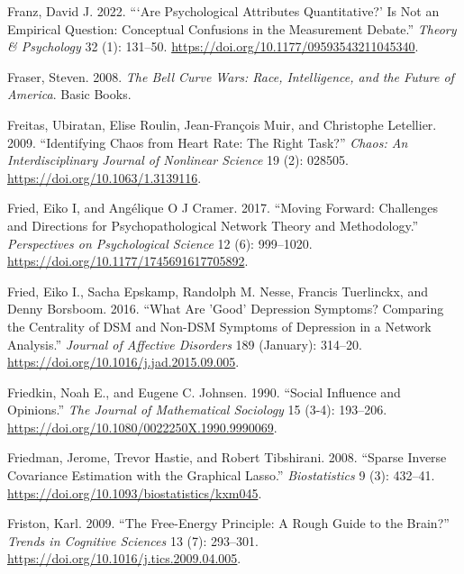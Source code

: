 \documentclass[
  a4paper,
  DIV=11,
  numbers=noendperiod,
  oneside]{scrreprt}
\newlength{\cslhangindent}
\newlength{\cslentryspacingunit} %
\newenvironment{CSLReferences}[2] %
 {%
  \setlength{\parindent}{0pt}
  \ifodd #1
  \let\oldpar\par
  \def\par{\hangindent=\cslhangindent\oldpar}
  \fi
  \setlength{\parskip}{#2\cslentryspacingunit}
 }%
 {}
\begin{document}
\begin{CSLReferences}{1}{0}
\leavevmode{}%
Franz, David J. 2022. {``{`{Are} Psychological Attributes
Quantitative?'} Is Not an Empirical Question: {Conceptual} Confusions in
the Measurement Debate.''} \emph{Theory \& Psychology} 32 (1): 131--50.
\url{https://doi.org/10.1177/09593543211045340}.

\leavevmode{}%
Fraser, Steven. 2008. \emph{The {Bell Curve Wars}: {Race},
{Intelligence}, and the {Future} of {America}}. {Basic Books}.

\leavevmode{}%
Freitas, Ubiratan, Elise Roulin, Jean-François Muir, and Christophe
Letellier. 2009. {``Identifying Chaos from Heart Rate: {The} Right
Task?''} \emph{Chaos: An Interdisciplinary Journal of Nonlinear Science}
19 (2): 028505. \url{https://doi.org/10.1063/1.3139116}.

\leavevmode{}%
Fried, Eiko I, and Angélique O J Cramer. 2017. {``Moving {Forward}:
{Challenges} and {Directions} for {Psychopathological Network Theory}
and {Methodology}.''} \emph{Perspectives on Psychological Science} 12
(6): 999--1020. \url{https://doi.org/10.1177/1745691617705892}.

\leavevmode{}%
Fried, Eiko I., Sacha Epskamp, Randolph M. Nesse, Francis Tuerlinckx,
and Denny Borsboom. 2016. {``What Are 'Good' Depression Symptoms?
{Comparing} the Centrality of {DSM} and Non-{DSM} Symptoms of Depression
in a Network Analysis.''} \emph{Journal of Affective Disorders} 189
(January): 314--20. \url{https://doi.org/10.1016/j.jad.2015.09.005}.

\leavevmode{}%
Friedkin, Noah E., and Eugene C. Johnsen. 1990. {``Social Influence and
Opinions.''} \emph{The Journal of Mathematical Sociology} 15 (3-4):
193--206. \url{https://doi.org/10.1080/0022250X.1990.9990069}.

\leavevmode{}%
Friedman, Jerome, Trevor Hastie, and Robert Tibshirani. 2008. {``Sparse
Inverse Covariance Estimation with the Graphical Lasso.''}
\emph{Biostatistics} 9 (3): 432--41.
\url{https://doi.org/10.1093/biostatistics/kxm045}.

\leavevmode{}%
Friston, Karl. 2009. {``The Free-Energy Principle: A Rough Guide to the
Brain?''} \emph{Trends in Cognitive Sciences} 13 (7): 293--301.
\url{https://doi.org/10.1016/j.tics.2009.04.005}.


\end{CSLReferences}
\end{document}
